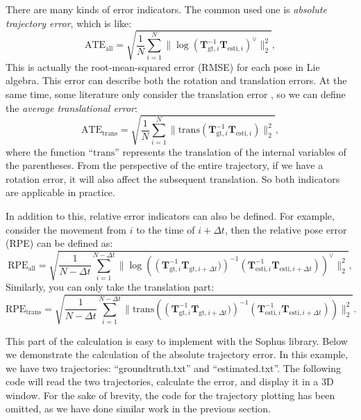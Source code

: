 There are many kinds of error indicators. The common used one is \textit{absolute trajectory error}, which is like:
\begin{equation}
\mathrm{ATE}_{\mathrm{all}} = \sqrt{ \frac{1}{N} \sum_{i=1}^N \| \log( \mathbf{T}_{\mathrm{gt },i}^{-1} \mathbf{T}_{\mathrm{esti},i} )^{\vee} \|_2^2},
\end{equation}
This is actually the root-mean-squared error (RMSE) for each pose in Lie algebra. This error can describe both the rotation and translation errors. At the same time, some literature only consider the translation error \cite{Sturm2012}, so we can define the \textit{average translational error}:
\begin{equation}
\mathrm{ATE}_{\mathrm{trans}} = \sqrt{ \frac{1}{N} \sum_{i=1}^N \| \mathrm{trans}( \mathbf{T}_{\mathrm{gt},i}^{-1} \mathbf{T}_{\mathrm{esti},i} ) \|_2^2},
\end{equation}
where the function ``$\mathrm{trans}$'' represents the translation of the internal variables of the parentheses. From the perspective of the entire trajectory, if we have a rotation error, it will also affect the subsequent translation. So both indicators are applicable in practice.

In addition to this, relative error indicators can also be defined. For example, consider the movement from $i$ to the time of $i+\Delta t$, then the relative pose error (RPE) can be defined as:
\begin{equation}
\mathrm{RPE}_{\mathrm{all}} = \sqrt{ \frac{1}{N-\Delta t} \sum_{i=1}^{N-\Delta t} \| \log \left ( \left(\mathbf{T}_{\mathrm{gt},i}^{-1} \mathbf{T}_{\mathrm{gt},i+\Delta t} )\right)^{-1 } \left(\mathbf{T}_{\mathrm{esti},i}^{-1} \mathbf{T}_{\mathrm{esti},i+\Delta t}\right)\right)^{ \vee} \|_2^2},
\end{equation}
Similarly, you can only take the translation part:
\begin{equation}
\mathrm{RPE}_{\mathrm{trans}} = \sqrt{ \frac{1}{N-\Delta t} \sum_{i=1}^{N-\Delta t} \| \mathrm{trans } \left( \left(\mathbf{T}_{\mathrm{gt},i}^{-1} \mathbf{T}_{\mathrm{gt},i+\Delta t} )\right)^ {-1} \left(\mathbf{T}_{\mathrm{esti},i}^{-1} \mathbf{T}_{\mathrm{esti},i+\Delta t}\right)\right ) \|_2^2}.
\end{equation}

This part of the calculation is easy to implement with the Sophus library. Below we demonstrate the calculation of the absolute trajectory error. In this example, we have two trajectories: ``groundtruth.txt'' and ``estimated.txt''. The following code will read the two trajectories, calculate the error, and display it in a 3D window. For the sake of brevity, the code for the trajectory plotting has been omitted, as we have done similar work in the previous section.
    
